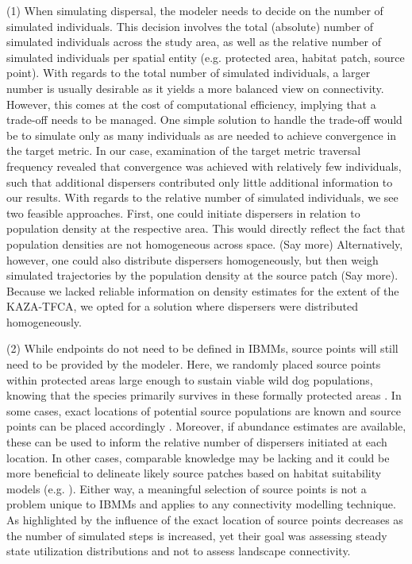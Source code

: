 \documentclass[abstract=on,10pt,a4paper,bibliography=totocnumbered]{article}
\begin{document}
(1) When simulating dispersal, the modeler needs to decide on the number of
simulated individuals. This decision involves the total (absolute) number of
simulated individuals across the study area, as well as the relative number of
simulated individuals per spatial entity (e.g. protected area, habitat patch,
source point). With regards to the total number of simulated individuals, a
larger number is usually desirable as it yields a more balanced view on
connectivity. However, this comes at the cost of computational efficiency,
implying that a trade-off needs to be managed. One simple solution to handle the
trade-off would be to simulate only as many individuals as are needed to achieve
convergence in the target metric. In our case, examination of the target metric
\textsf{traversal frequency} revealed that convergence was achieved with
relatively few individuals, such that additional dispersers contributed only
little additional information to our results. With regards to the relative
number of simulated individuals, we see two feasible approaches. First, one
could initiate dispersers in relation to population density at the respective
area. This would directly reflect the fact that population densities are not
homogeneous across space. (Say more) Alternatively, however, one could also
distribute dispersers homogeneously, but then weigh simulated trajectories by
the population density at the source patch (Say more). Because we lacked
reliable information on density estimates for the extent of the KAZA-TFCA, we
opted for a solution where dispersers were distributed homogeneously.

(2) While endpoints do not need to be defined in IBMMs, source points will still
need to be provided by the modeler. Here, we randomly placed source points
within protected areas large enough to sustain viable wild dog populations,
knowing that the species primarily survives in these formally protected areas
\citep{Woodroffe.1999, DaviesMostert.2012, Woodroffe.2012, VanDerMeer.2014}. In
some cases, exact locations of potential source populations are known and source
points can be placed accordingly \citep{Kanagaraj.2013}. Moreover, if abundance
estimates are available, these can be used to inform the relative number of
dispersers initiated at each location. In other cases, comparable knowledge may
be lacking and it could be more beneficial to delineate likely source patches
based on habitat suitability models (e.g. \citealp{Squires.2013}). Either way, a
meaningful selection of source points is not a problem unique to IBMMs and
applies to any connectivity modelling technique. As highlighted by
\cite{Signer.2017} the influence of the exact location of source points
decreases as the number of simulated steps is increased, yet their goal was
assessing steady state utilization distributions and not to assess landscape
connectivity.
\end{document}
